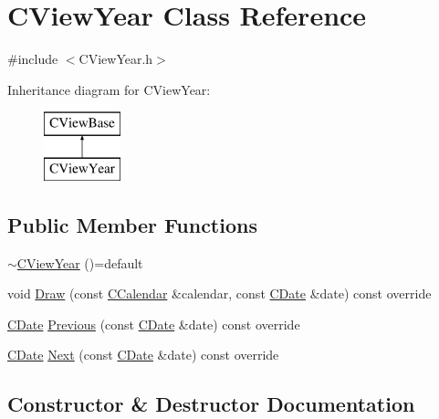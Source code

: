 \hypertarget{class_c_view_year}{}\section{C\+View\+Year Class Reference}
\label{class_c_view_year}


{\ttfamily \#include $<$C\+View\+Year.\+h$>$}

Inheritance diagram for C\+View\+Year\+:\begin{figure}[H]
\begin{center}
\leavevmode
\includegraphics[height=2.000000cm]{class_c_view_year}
\end{center}
\end{figure}
\subsection*{Public Member Functions}
\begin{DoxyCompactItemize}
\item 
\mbox{\hyperlink{class_c_view_year_ac69be96e6e14d86bf4507e4a549e1710}{$\sim$\+C\+View\+Year}} ()=default
\item 
void \mbox{\hyperlink{class_c_view_year_ad8f7c1b95dc1e46ae842f9e36aff6669}{Draw}} (const \mbox{\hyperlink{class_c_calendar}{C\+Calendar}} \&calendar, const \mbox{\hyperlink{class_c_date}{C\+Date}} \&date) const override
\item 
\mbox{\hyperlink{class_c_date}{C\+Date}} \mbox{\hyperlink{class_c_view_year_a638b9541c8e0396a263bcff37a126f81}{Previous}} (const \mbox{\hyperlink{class_c_date}{C\+Date}} \&date) const override
\item 
\mbox{\hyperlink{class_c_date}{C\+Date}} \mbox{\hyperlink{class_c_view_year_a93c8851786eac9fffe55cf006965a505}{Next}} (const \mbox{\hyperlink{class_c_date}{C\+Date}} \&date) const override
\end{DoxyCompactItemize}


\subsection{Constructor \& Destructor Documentation}
\mbox{\label{class_c_view_year_ac69be96e6e14d86bf4507e4a549e1710}} 
